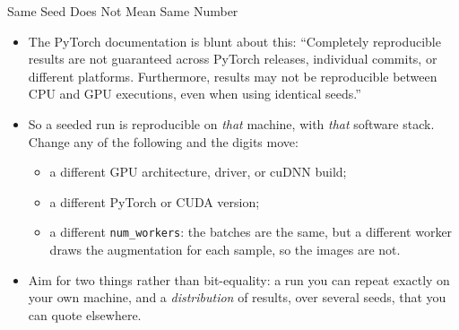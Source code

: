 \begin{frame}{Same Seed Does Not Mean Same Number}
\begin{itemize}
    \item The PyTorch documentation is blunt about this: ``Completely reproducible results are not guaranteed across PyTorch releases, individual commits, or different platforms. Furthermore, results may not be reproducible between CPU and GPU executions, even when using identical seeds.''
    \item So a seeded run is reproducible on \emph{that} machine, with \emph{that} software stack. Change any of the following and the digits move:
    \begin{itemize}
        \item a different GPU architecture, driver, or cuDNN build;
        \item a different PyTorch or CUDA version;
        \item a different \texttt{num\_workers}: the batches are the same, but a different worker draws the augmentation for each sample, so the images are not.
    \end{itemize}
    \item Aim for two things rather than bit-equality: a run you can repeat exactly on your own machine, and a \emph{distribution} of results, over several seeds, that you can quote elsewhere.
\end{itemize}
\end{frame}

